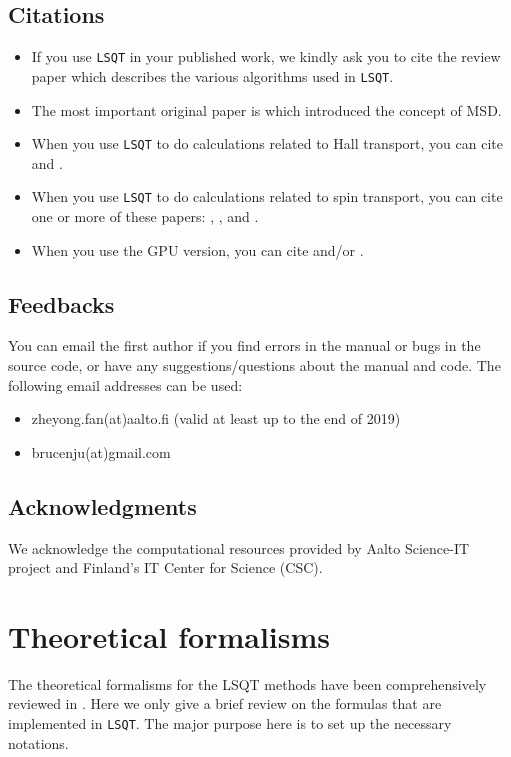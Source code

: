 \documentclass[12pt,a4paper]{report}
\begin{document}
\section{Citations}
\begin{itemize}
\item If you use \verb"LSQT" in your published work, we kindly ask you to cite the review paper \cite{fan2018arxiv} which describes the various algorithms used in \verb"LSQT".
\item The most important original paper is \cite{roche1997prl} which introduced the concept of MSD. 
\item When you use \verb"LSQT" to do calculations related to Hall transport, you can cite \citet{ortmann2015prb} and \citet{garcia2015prl}.
\item When you use \verb"LSQT" to do calculations related to spin transport, you can cite one or more of these papers: \citet{vantuan2014np}, \citet{vierimaa2017prb}, and \cite{Cummings2017prl}.
\item When you use the GPU version, you can cite \cite{fan2018cpc} and/or \cite{fan2014cpc}.
\end{itemize}

\section{Feedbacks}

You can email the first author if you find errors in the manual or bugs in the source code, or have any suggestions/questions about the manual and code. The following email addresses can be used:
\begin{itemize}
\item zheyong.fan(at)aalto.fi (valid at least up to the end of 2019)
\item brucenju(at)gmail.com
\end{itemize}


\section{Acknowledgments}
We acknowledge the computational resources provided by Aalto Science-IT project and Finland's IT Center for Science (CSC).

\chapter{Theoretical formalisms\label{section:theory}}

The theoretical formalisms for the LSQT methods have been comprehensively reviewed in \cite{fan2018arxiv}. Here we only give a brief review on the formulas that are implemented in \verb"LSQT". The major purpose here is to set up the necessary notations.
\end{document}
